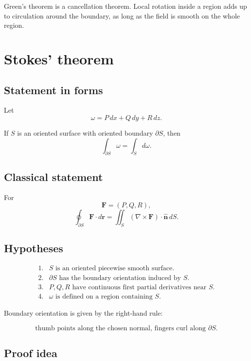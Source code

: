 Green's theorem is a cancellation theorem.  Local rotation inside a region adds up to
circulation around the boundary, as long as the field is smooth on the whole region.

\section{Stokes' theorem}
\label{app:F.5}

\subsection*{Statement in forms}

Let
\[
    \omega=P\,dx+Q\,dy+R\,dz.
\]

If \(S\) is an oriented surface with oriented boundary \(\partial S\), then
\[
\boxed{
    \int_{\partial S}\omega
    =
    \int_S d\omega.
}
\]

\subsection*{Classical statement}

For
\[
    \mathbf F=(P,Q,R),
\]
\[
\boxed{
    \oint_{\partial S}\mathbf F\cdot d\mathbf r
    =
    \iint_S
    (\nabla\times\mathbf F)\cdot\widehat{\mathbf n}\,dS.
}
\]

\subsection*{Hypotheses}

\[
\begin{array}{ll}
1. & S\text{ is an oriented piecewise smooth surface.}\\[1mm]
2. & \partial S\text{ has the boundary orientation induced by }S.\\[1mm]
3. & P,Q,R\text{ have continuous first partial derivatives near }S.\\[1mm]
4. & \omega\text{ is defined on a region containing }S.
\end{array}
\]

Boundary orientation is given by the right-hand rule:

\[
\boxed{
    \text{thumb points along the chosen normal, fingers curl along }\partial S.
}
\]

\subsection*{Proof idea}

